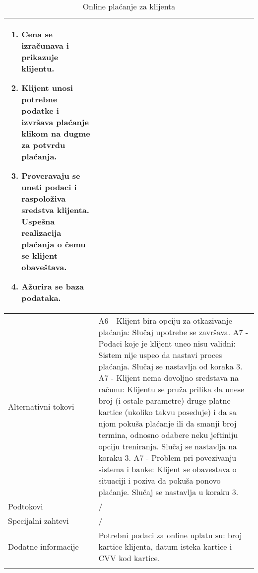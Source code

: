 \documentclass[../main.tex]{subfiles}
\begin{document}
\begin{longtable}{| p{} | p{} |}
\begin{enumerate}
 		\item Cena se izračunava i prikazuje klijentu. %
		\item Klijent unosi potrebne podatke i izvršava plaćanje klikom na dugme za potvrdu plaćanja.
		\item Proveravaju se uneti podaci i raspoloživa sredstva klijenta. Uspešna realizacija plaćanja o čemu se klijent obaveštava.
		\item Ažurira se baza podataka. %
    \end{enumerate}\\
\hline
    Alternativni tokovi &
       		A6 - Klijent bira opciju za otkazivanje plaćanja: Slučaj upotrebe se završava.
        	A7 - Podaci koje je klijent uneo nisu validni:  Sistem nije uspeo da nastavi proces plaćanja. Slučaj se nastavlja od koraka 3.
        	A7 - Klijent nema dovoljno sredstava na računu: Klijentu se pruža prilika da unese broj (i ostale parametre) druge platne kartice (ukoliko takvu poseduje) i da sa njom pokuša plaćanje ili da smanji broj termina, odnosno odabere neku jeftiniju opciju treniranja. Slučaj se nastavlja na koraku 3.
        	A7 - Problem pri povezivanju sistema i banke: Klijent se obavestava o situaciji i poziva da pokuša ponovo plaćanje. Slučaj se nastavlja u koraku 3.\\
\hline
    Podtokovi & / \\
\hline
    Specijalni zahtevi & / \\
\hline
    Dodatne informacije & Potrebni podaci za online uplatu su: broj kartice klijenta, datum isteka kartice i CVV kod kartice. \\
\hline
\caption{Online plaćanje za klijenta} %
\label{tab:myfirstlongtable}
\end{longtable}

\end{document}
